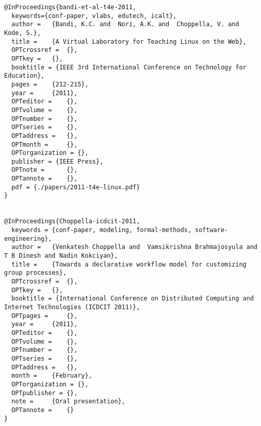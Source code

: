 \documentclass[11pt]{article}
\begin{document}
\begin{lstlisting}
@InProceedings{bandi-et-al-t4e-2011,
  keywords={conf-paper, vlabs, edutech, icalt},
  author = 	 {Bandi, K.C. and  Nori, A.K. and  Choppella, V. and  Kode, S.},
  title = 	 {A Virtual Laboratory for Teaching Linux on the Web},
  OPTcrossref =  {},
  OPTkey = 	 {},
  booktitle = {IEEE 3rd International Conference on Technology for Education},
  pages = 	 {212-215},
  year = 	 {2011},
  OPTeditor = 	 {},
  OPTvolume = 	 {},
  OPTnumber = 	 {},
  OPTseries = 	 {},
  OPTaddress = 	 {},
  OPTmonth = 	 {},
  OPTorganization = {},
  publisher = {IEEE Press},
  OPTnote = 	 {},
  OPTannote = 	 {},
  pdf = {./papers/2011-t4e-linux.pdf}
}


@InProceedings{Choppella-icdcit-2011,
  keywords = {conf-paper, modeling, formal-methods, software-engineering},
  author = 	 {Venkatesh Choppella and  Vamsikrishna Brahmajosyula and T B Dinesh and Nadin Kokciyan},
  title = 	 {Towards a declarative workflow model for customizing group processes},
  OPTcrossref =  {},
  OPTkey = 	 {},
  booktitle = {International Conference on Distributed Computing and Internet Technologies (ICDCIT 2011)},
  OPTpages = 	 {},
  year = 	 {2011},
  OPTeditor = 	 {},
  OPTvolume = 	 {},
  OPTnumber = 	 {},
  OPTseries = 	 {},
  OPTaddress = 	 {},
  month = 	 {February},
  OPTorganization = {},
  OPTpublisher = {},
  note = 	 {Oral presentation},
  OPTannote = 	 {}
}
\end{lstlisting}
\end{document}
